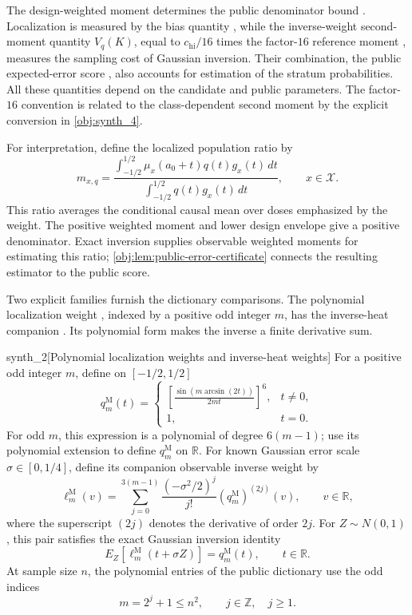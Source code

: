 The design-weighted moment  determines the public denominator bound . Localization is measured by the bias quantity , while the inverse-weight second-moment quantity \(V_q(K)\), equal to \(c_{\mathrm{hi}}/16\) times the factor-\(16\) reference moment , measures the sampling cost of Gaussian inversion. Their combination, the public expected-error score , also accounts for estimation of the stratum probabilities. All these quantities depend on the candidate and public parameters. The factor-\(16\) convention is related to the class-dependent second moment by the explicit conversion in \cref{obj:synth_4}.

For interpretation, define the localized population ratio  by
\[
m_{x,q}
=
\frac{\displaystyle\int_{-1/2}^{1/2}
\mu_x(a_0+t)q(t)g_x(t)\,dt}
{\displaystyle\int_{-1/2}^{1/2}q(t)g_x(t)\,dt},
\qquad x\in\mathcal X.
\]
This ratio averages the conditional causal mean over doses emphasized by the weight. The positive weighted moment and lower design envelope give a positive denominator. Exact inversion supplies observable weighted moments for estimating this ratio; \cref{obj:lem:public-error-certificate} connects the resulting estimator to the public score.

Two explicit families furnish the dictionary comparisons. The polynomial localization weight , indexed by a positive odd integer \(m\), has the inverse-heat companion . Its polynomial form makes the inverse a finite derivative sum.

\begin{definitionv}{synth_2}[Polynomial localization weights and inverse-heat weights]
For a positive odd integer \(m\), define on \([-1/2,1/2]\)
\[
q_m^{\mathrm M}(t)=
\begin{cases}
\displaystyle
\left[\frac{\sin(m\arcsin(2t))}{2mt}\right]^6,
&t\ne0,\\[6pt]
1,&t=0.
\end{cases}
\]
For odd \(m\), this expression is a polynomial of degree \(6(m-1)\); use its polynomial extension to define \(q_m^{\mathrm M}\) on \(\mathbb R\). For known Gaussian error scale \(\sigma\in[0,1/4]\), define its companion observable inverse weight by
\[
\ell_m^{\mathrm M}(v)
=\sum_{j=0}^{3(m-1)}
\frac{(-\sigma^2/2)^j}{j!}
(q_m^{\mathrm M})^{(2j)}(v),
\qquad v\in\mathbb R,
\]
where the superscript \((2j)\) denotes the derivative of order \(2j\). For \(Z\sim N(0,1)\), this pair satisfies the exact Gaussian inversion identity
\[
E_Z\!\left[\ell_m^{\mathrm M}(t+\sigma Z)\right]
=q_m^{\mathrm M}(t),\qquad t\in\mathbb R.
\]
At sample size \(n\), the polynomial entries of the public dictionary use the odd indices
\[
m=2^j+1\le n^2,\qquad j\in\mathbb Z,\quad j\ge1.
\]
\end{definitionv}

